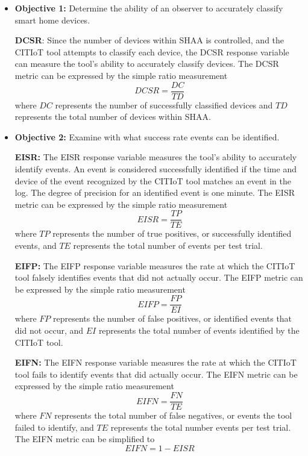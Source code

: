 \documentclass[12pt,letterpaper,oneside]{book}
\begin{document}
		\begin{itemize}
			\item \textbf{Objective 1:} Determine the ability of an observer to accurately classify smart home devices.
				
			\hspace{4ex}\textbf{\ac{DCSR}}: Since the number of devices within \ac{SHAA} is controlled, and the \ac{CITIoT} tool attempts to classify each device, the \ac{DCSR} response variable can measure the tool's ability to accurately classify devices. The \ac{DCSR} metric can be expressed by the simple ratio measurement
			\begin{equation}
			DCSR = \frac{DC}{TD}
			\end{equation}
			where $DC$ represents the number of successfully classified devices and $TD$ represents the total number of devices within \ac{SHAA}.
			
			\item \textbf{Objective 2:} Examine with what success rate events can be identified.
			
			\hspace{4ex}\textbf{\ac{EISR}:} The \ac{EISR} response variable measures the tool's ability to accurately identify events. An event is considered successfully identified if the time and device of the event recognized by the \ac{CITIoT} tool matches an event in the log. The degree of precision for an identified event is one minute. The \ac{EISR} metric can be expressed by the simple ratio measurement
			\begin{equation}
			EISR = \frac{TP}{TE}
			\end{equation}
			where $TP$ represents the number of true positives, or successfully identified events, and $TE$ represents the total number of events per test trial.
			
			\hspace{4ex}\textbf{\ac{EIFP}:} The \ac{EIFP} response variable measures the rate at which the \ac{CITIoT} tool falsely identifies events that did not actually occur. The \ac{EIFP} metric can be expressed by the simple ratio measurement
			\begin{equation}
			EIFP = \frac{FP}{EI}
			\end{equation}
			where $FP$ represents the number of false positives, or identified events that did not occur, and $EI$ represents the total number of events identified by the \ac{CITIoT} tool.
			
			\hspace{4ex}\textbf{\ac{EIFN}:} The \ac{EIFN} response variable measures the rate at which the \ac{CITIoT} tool fails to identify events that did actually occur. The \ac{EIFN} metric can be expressed by the simple ratio measurement
			\begin{equation}
			EIFN = \frac{FN}{TE}
			\end{equation}
			where $FN$ represents the total number of false negatives, or events the tool failed to identify, and $TE$ represents the total number events per test trial. The \ac{EIFN} metric can be simplified to
			\begin{equation}
			EIFN = 1 - EISR
			\end{equation}
			

\end{itemize}
\end{document}
